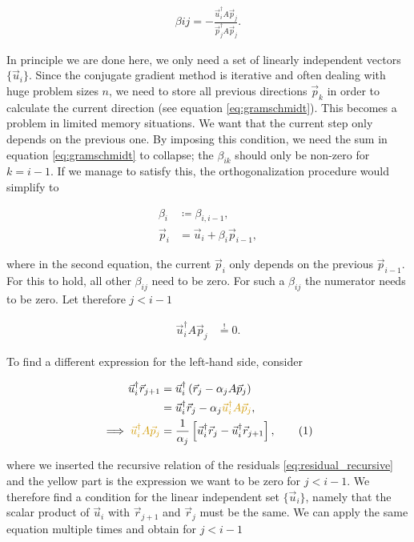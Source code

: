 \documentclass{article}
\newcommand\numberthis{\addtocounter{equation}{1}\tag{\theequation}}
\theoremstyle{plain} %
\theoremstyle{convention} %
\theoremstyle{remark} %
\numberwithin{equation}{section}
\begin{document}
\begin{align}
    \beta{ij} = - \frac{ \vec{u}_i^{\dagger} A \vec{p}_j }{ \vec{p}_j^{\dagger} A \vec{p}_j }. \label{eq:betas}
\end{align}

In principle we are done here, we only need a set of linearly independent vectors $\{\vec{u}_i\}$. Since the conjugate gradient method is iterative and often dealing with huge problem sizes $n$, we need to store all previous directions $\vec{p}_k$ in order to calculate the current direction (see equation \eqref{eq:gramschmidt}). This becomes a problem in limited memory situations. We want that the current step only depends on the previous one. By imposing this condition, we need the sum in equation \eqref{eq:gramschmidt} to collapse; the $\beta_{ik}$ should only be non-zero for $k=i-1$. If we manage to satisfy this, the orthogonalization procedure would simplify to

\begin{align*}
    \beta_i &\coloneqq \beta_{i, i-1}, \\
    \vec{p}_i &= \vec{u}_i + \beta_i \vec{p}_{i-1},
\end{align*}

where in the second equation, the current $\vec{p}_i$ only depends on the previous $\vec{p}_{i-1}$. For this to hold, all other $\beta_{ij}$ need to be zero. For such a $\beta_{ij}$ the numerator needs to be zero. Let therefore $j<i-1$

\begin{align*}
    \vec{u}_i^{\dagger} A \vec{p}_j &\stackrel{!}{=} 0.
\end{align*}

To find a different expression for the left-hand side, consider

\begin{align*}
    \vec{u}_i^{\dagger} \vec{r}_{j+1} &= \vec{u}_i^{\dagger} \left( \vec{r}_j - \alpha_j A \vec{p}_j \right) \\
    &= \vec{u}_i^{\dagger} \vec{r}_j - \alpha_j \textcolor{cyellow}{\vec{u}_i^{\dagger} A \vec{p}_j}, \\
    \implies \textcolor{cyellow}{\vec{u}_i^{\dagger} A \vec{p}_j} &= \frac{1}{\alpha_j} \left[ \vec{u}_i^{\dagger} \vec{r}_j - \vec{u}_i^{\dagger} \vec{r}_{j+1} \right], \numberthis \label{eq:uiAdj}
\end{align*}

where we inserted the recursive relation of the residuals \eqref{eq:residual_recursive} and the \textcolor{cyellow}{yellow} part is the expression we want to be \textcolor{cyellow}{zero} for $j<i-1$. We therefore find a condition for the linear independent set $\{\vec{u}_i\}$, namely that the scalar product of $\vec{u}_i$ with $\vec{r}_{j+1}$ and $\vec{r}_{j}$ must be the same. We can apply the same equation multiple times and obtain for $j<i-1$
\end{document}
